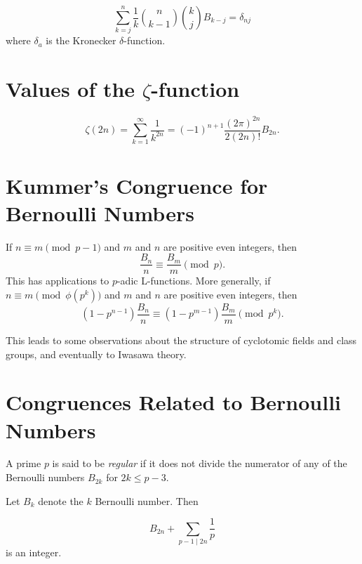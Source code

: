 \begin{equation*}
  \sum_{k=j}^n\frac{1}{k}\binom{n}{k-1}\binom{k}{j} B_{k-j}=\delta_{nj}
\end{equation*}
where $\delta_a$ is the Kronecker $\delta$-function.

\section{Values of the \texorpdfstring{$\zeta$}{ζ}-function}

\begin{equation*}[Euler]
  \zeta(2n)=\sum_{k=1}^{\infty}\frac{1}{k^{2n}}=(-1)^{n+1}\frac{(2\pi)^{2n}}{2(2n)!}B_{2n}.
\end{equation*}

\section{Kummer's Congruence for Bernoulli Numbers}

If $n\equiv m\pmod{p-1}$ and $m$ and $n$ are positive even integers, then
\begin{equation*}
  \frac{B_n}{n}\equiv \frac{B_m}{m}\pmod{p}.
\end{equation*}
This has applications to $p$-adic L-functions. More generally, if $n\equiv m\pmod{\phi(p^k)}$ and $m$ and $n$ are positive even integers, then
\begin{equation*}
  (1-p^{n-1})\frac{B_n}{n}\equiv (1-p^{m-1})\frac{B_m}{m}\pmod{p^k}.
\end{equation*}

This leads to some observations about the structure of cyclotomic fields and class groups, and eventually to Iwasawa theory.

\section{Congruences Related to Bernoulli Numbers}

\begin{definition}
  A prime $p$ is said to be \emph{regular} if it does not divide the numerator of any of the Bernoulli numbers $B_{2k}$ for $2k\leq p-3$.
\end{definition}

\begin{theorem}
  Let  $B_k$ denote the $k$\supth{} Bernoulli number. Then
  
  \begin{equation*}
    B_{2n}+\sum_{p-1\mid 2n}\frac{1}{p}
  \end{equation*}
  is an integer.
\end{theorem}

